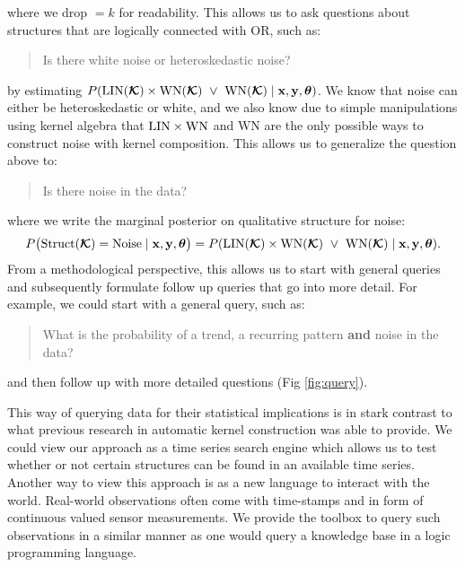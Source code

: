 where we drop $=k$ for readability. This allows us to ask questions about structures that are logically connected with OR, such as:
\begin{quotation}
Is there white noise or heteroskedastic noise?
\end{quotation}
by estimating $P(\text{LIN}(\bm{\mathcal{K}}) \times \text{WN}(\bm{\mathcal{K}})\;\;{\large\lor}\;\; \text{WN}(\bm{\mathcal{K}}) \mid
\mathbf{x}, \mathbf{y}, \bm{\theta})$.
We know that noise can either be heteroskedastic or white,
and we also know due to simple manipulations using kernel algebra
that  $\text{LIN} \times \text{WN}$ and $\text{WN}$ are the only possible ways to
construct noise with kernel composition. This allows us to generalize the 
question above to:
\begin{quotation}
Is there noise in the data? 
\end{quotation}
where we write the marginal posterior on qualitative structure for noise:
\begin{equation}
P\big(\text{Struct}(\bm{\mathcal{K}})=\text{Noise} \mid \mathbf{x}, \mathbf{y}, \bm{\theta}\big) = P(\text{LIN}(\bm{\mathcal{K}}) \times
\text{WN}(\bm{\mathcal{K}})\;\;{\large\lor}\;\; \text{WN}(\bm{\mathcal{K}}) \mid \mathbf{x}, \mathbf{y}, \bm{\theta}).
\end{equation}
From a methodological perspective, this allows us to start with general queries and 
subsequently formulate follow up queries that go into more detail.
For example, we could start with a general query, such as:
\begin{quotation}
What is the probability of a trend, a recurring pattern {\bf and} noise in the data?
\end{quotation}
and then follow up with more detailed questions (Fig \ref{fig:query}).

This way of querying data for their statistical implications is in stark contrast to what previous research in automatic kernel construction was able to provide.
We could view our approach as a time series search engine which allows us to test whether or not certain structures can be found
in an available time series.
Another way to view this approach is as a new language to interact with the world.
Real-world observations often come with time-stamps and in form
of continuous valued sensor measurements.  
We provide the toolbox to query such observations in a similar manner as
one would query a knowledge base in a logic programming language.






